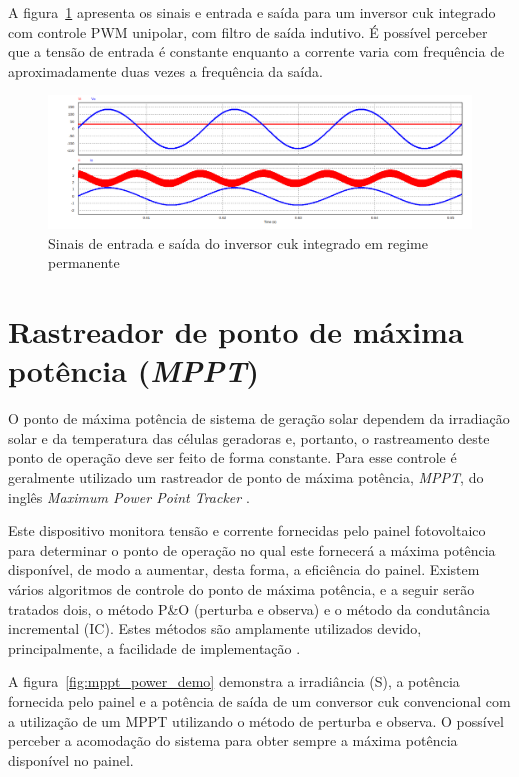 \documentclass[
	12pt,				%
	openany,
	onseside,
	a4paper,			%
	english,			%
	french,				%
	spanish,			%
	brazil,				%
	]{abntex2}
\begin{document}
A figura~\ref{fig:integ_cuk_In_Out_zoom} apresenta os sinais e entrada e saída para um inversor cuk integrado com controle PWM unipolar, com filtro de saída indutivo. É possível perceber que a tensão de entrada é constante enquanto a corrente varia com frequência de aproximadamente duas vezes a frequência da saída.

\begin{figure}[htb]
	\centering
		\includegraphics[width= \linewidth]{cuk_integ_In_Out_zoom_2}
		\caption{Sinais de entrada e saída do inversor cuk integrado em regime permanente}
		\label{fig:integ_cuk_In_Out_zoom}
\end{figure}


\section{Rastreador de ponto de máxima potência (\textit{MPPT})}

O ponto de máxima potência de sistema de geração solar dependem da irradiação solar e da temperatura das células geradoras e, portanto, o rastreamento deste ponto de operação deve ser feito de forma constante. Para esse controle é geralmente utilizado um rastreador de ponto de máxima potência, \emph{MPPT}, do inglês \textit{Maximum Power Point Tracker} \cite{Talha_MPPT}. 

Este dispositivo monitora tensão e corrente fornecidas pelo painel fotovoltaico para determinar o ponto de operação no qual este fornecerá a máxima potência disponível, de modo a aumentar, desta forma, a eficiência do painel. Existem vários algoritmos de controle do ponto de máxima potência, e a seguir serão tratados dois, o método P\&O (perturba e observa) e o método da condutância incremental (IC). Estes métodos são amplamente utilizados devido, principalmente, a facilidade de implementação \cite{MPPT_P&O_IC}\cite{Talha_MPPT}.

A figura~\ref{fig:mppt_power_demo} demonstra a irradiância (S), a potência fornecida pelo painel e a potência de saída de um conversor cuk convencional com a utilização de um MPPT utilizando o método de perturba e observa. O possível perceber a acomodação do sistema para obter sempre a máxima potência disponível no painel.   
\end{document}
